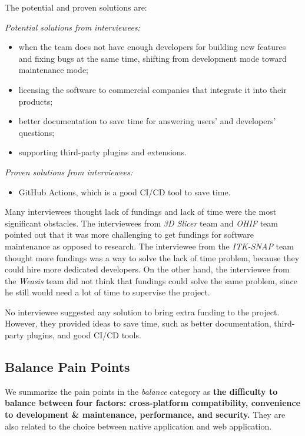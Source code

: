 The potential and proven solutions are:

\noindent\textit{Potential solutions from interviewees:}
\begin{itemize}
\item when the team does not have enough developers for building new features and fixing bugs at the same time, shifting from development mode toward maintenance mode;
\item licensing the software to commercial companies that integrate it into their products;
\item better documentation to save time for answering users' and developers' questions;
\item supporting third-party plugins and extensions.
\end{itemize}

\noindent\textit{Proven solutions from interviewees:}
\begin{itemize}
\item GitHub Actions, which is a good CI/CD tool to save time.
\end{itemize}

Many interviewees thought lack of fundings and lack of time were the most significant obstacles. The interviewees from \textit{3D Slicer} team and \textit{OHIF} team pointed out that it was more challenging to get fundings for software maintenance as opposed to research. The interviewee from the \textit{ITK-SNAP} team thought more fundings was a way to solve the lack of time problem, because they could hire more dedicated developers. On the other hand, the interviewee from the \textit{Weasis} team did not think that fundings could solve the same problem, since he still would need a lot of time to supervise the project.

No interviewee suggested any solution to bring extra funding to the project. However, they provided ideas to save time, such as better documentation, third-party plugins, and good CI/CD tools.

\subsection{Balance Pain Points}
\label{sec_pain_points_2}
We summarize the pain points in the \textit{balance} category as
\textbf{the difficulty to balance between four factors: cross-platform compatibility, convenience to development \& maintenance, performance, and security.} They are also related to the choice between native application and web application.

